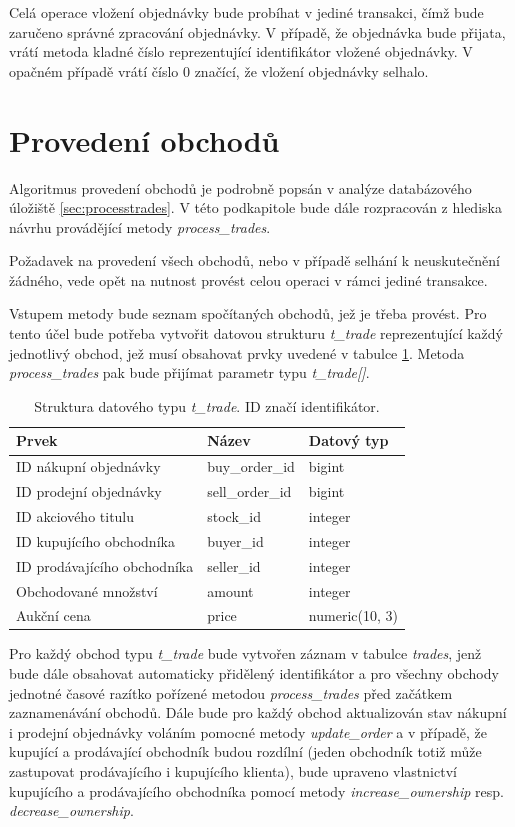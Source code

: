 \documentclass[thesis=M,czech]{FITthesis}[2012/06/26]
\begin{document}
Celá operace vložení objednávky bude probíhat v jediné transakci, čímž bude zaručeno správné zpracování objednávky. V případě, že 
objednávka bude přijata, vrátí metoda kladné číslo reprezentující identifikátor vložené objednávky. V opačném případě vrátí číslo 0 značící, 
že vložení objednávky selhalo.



\section{Provedení obchodů}

Algoritmus provedení obchodů je podrobně popsán v analýze databázového úložiště \ref{sec:processtrades}. V této podkapitole bude dále 
rozpracován z hlediska návrhu provádějící metody \textit{process\_trades}.

Požadavek na provedení všech obchodů, nebo v případě selhání k neuskutečnění žádného, vede opět na nutnost provést celou operaci 
v rámci jediné transakce. 

Vstupem metody bude seznam spočítaných obchodů, jež je třeba provést. Pro tento účel bude potřeba vytvořit datovou strukturu 
\textit{t\_trade} reprezentující každý jednotlivý obchod, jež musí obsahovat prvky uvedené v tabulce \ref{tab:dbttrade}. Metoda 
\textit{process\_trades} pak bude přijímat parametr typu \textit{t\_trade[]}.


\begin{table}\centering
	\begin{tabular}{| l | l | l |}\hline
		Prvek					& Název		& Datový typ	\tabularnewline \hline \hline
		ID nákupní objednávky		& buy\_order\_id	& bigint		\tabularnewline \hline
		ID prodejní objednávky		& sell\_order\_id	& bigint		\tabularnewline \hline
		ID akciového titulu			& stock\_id		& integer		\tabularnewline \hline
		ID kupujícího obchodníka		& buyer\_id		& integer		\tabularnewline \hline
		ID prodávajícího obchodníka	& seller\_id		& integer		\tabularnewline \hline
		Obchodované množství		& amount		& integer		\tabularnewline \hline 
		Aukční cena				& price		& numeric(10, 3)	\tabularnewline \hline 
	\end{tabular}
	\caption[Struktura datového typu \textit{t\_trade}]{Struktura datového typu \textit{t\_trade}. ID značí identifikátor.}
	\label{tab:dbttrade}
\end{table}


Pro každý obchod typu \textit{t\_trade} bude vytvořen záznam v tabulce \textit{trades}, jenž bude dále obsahovat automaticky přidělený 
identifikátor a pro všechny obchody jednotné časové razítko pořízené metodou \textit{process\_trades} před začátkem zaznamenávání 
obchodů. Dále bude pro každý obchod aktualizován stav nákupní i prodejní objednávky voláním pomocné metody \textit{update\_order} a 
v případě, že kupující a prodávající obchodník budou rozdílní (jeden obchodník totiž může zastupovat prodávajícího i kupujícího klienta), bude
upraveno vlastnictví kupujícího a prodávajícího obchodníka pomocí metody \textit{increase\_ownership} resp. \textit{decrease\_ownership}.
\end{document}

